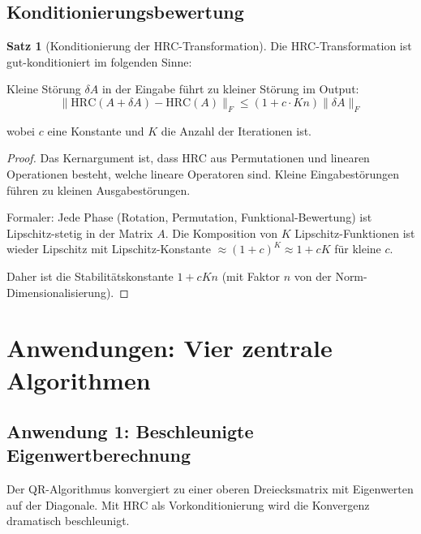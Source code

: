 \documentclass[a4paper,12pt]{article}
\theoremstyle{definition}
\newtheorem{satz}{Satz}
\begin{document}
\subsection{Konditionierungsbewertung}

\begin{satz}[Konditionierung der HRC-Transformation]
Die HRC-Transformation ist gut-konditioniert im folgenden Sinne:

Kleine Störung $\delta A$ in der Eingabe führt zu kleiner Störung im Output:
\[
\|\text{HRC}(A + \delta A) - \text{HRC}(A)\|_F \leq (1 + c \cdot K n) \|\delta A\|_F
\]

wobei $c$ eine Konstante und $K$ die Anzahl der Iterationen ist.
\end{satz}

\begin{proof}
Das Kernargument ist, dass HRC aus Permutationen und linearen Operationen besteht, welche lineare Operatoren sind. Kleine Eingabestörungen führen zu kleinen Ausgabestörungen.

Formaler: Jede Phase (Rotation, Permutation, Funktional-Bewertung) ist Lipschitz-stetig in der Matrix $A$. Die Komposition von $K$ Lipschitz-Funktionen ist wieder Lipschitz mit Lipschitz-Konstante $\approx (1 + c)^K \approx 1 + c K$ für kleine $c$.

Daher ist die Stabilitätskonstante $1 + c K n$ (mit Faktor $n$ von der Norm-Dimensionalisierung).
\end{proof}

\section{Anwendungen: Vier zentrale Algorithmen}

\subsection{Anwendung 1: Beschleunigte Eigenwertberechnung}

Der QR-Algorithmus konvergiert zu einer oberen Dreiecksmatrix mit Eigenwerten auf der Diagonale. Mit HRC als Vorkonditionierung wird die Konvergenz dramatisch beschleunigt.
\end{document}
